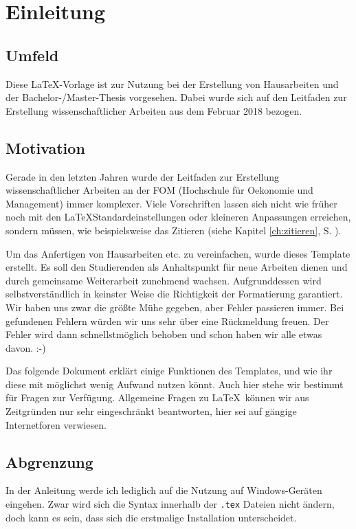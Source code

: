 
\chapter{Einleitung}\label{ch:einleitung}

\section{Umfeld}

Diese \LaTeX -Vorlage ist zur Nutzung bei der Erstellung von Hausarbeiten und der Bachelor-/Master-Thesis vorgesehen. 
Dabei wurde sich auf den Leitfaden zur Erstellung wissenschaftlicher Arbeiten aus dem Februar 2018 bezogen.\autocite[Vgl.][]{leitfaden}

\section{Motivation}

Gerade in den letzten Jahren wurde der Leitfaden zur Erstellung wissenschaftlicher Arbeiten an der FOM (Hochschule für Oekonomie und Management) immer komplexer. 
Viele Vorschriften lassen sich nicht wie früher noch mit den \LaTeX\-Standardeinstellungen oder kleineren Anpassungen erreichen, sondern müssen, wie beispielsweise das Zitieren (siehe Kapitel \ref{ch:zitieren}, S. \pageref{ch:zitieren}).

Um das Anfertigen von Hausarbeiten etc. zu vereinfachen, wurde dieses Template erstellt. 
Es soll den Studierenden als Anhaltspunkt für neue Arbeiten dienen und durch gemeinsame Weiterarbeit zunehmend wachsen.
Aufgrunddessen wird selbstverständlich in keinster Weise die Richtigkeit der Formatierung garantiert. 
Wir haben uns zwar die größte Mühe gegeben, aber Fehler passieren immer. 
Bei gefundenen Fehlern würden wir uns sehr über eine Rückmeldung freuen. 
Der Fehler wird dann schnellstmöglich behoben und schon haben wir alle etwas davon. :-)

Das folgende Dokument erklärt einige Funktionen des Templates, und wie ihr diese mit möglichst wenig Aufwand nutzen könnt. Auch hier stehe wir bestimmt für Fragen zur Verfügung. Allgemeine Fragen zu \LaTeX\ können wir aus Zeitgründen nur sehr eingeschränkt beantworten, hier sei auf gängige Internetforen verwiesen.

\section{Abgrenzung}
In der Anleitung werde ich lediglich auf die Nutzung auf Windows-Geräten eingehen. 
Zwar wird sich die Syntax innerhalb der \texttt{.tex} Dateien nicht ändern, doch kann es sein, dass sich die erstmalige Installation unterscheidet.